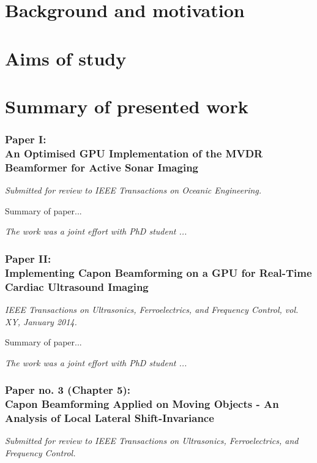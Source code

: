 \section{Background and motivation}

\section{Aims of study}

\section{Summary of presented work}

\subsubsection{Paper I:\\
An Optimised GPU Implementation of the MVDR Beamformer for Active Sonar Imaging}

{\it Submitted for review to IEEE Transactions on Oceanic Engineering.}
\vspace{0.3 cm}

Summary of paper...

\vspace{0.3 cm}
\emph{The work was a joint effort with PhD student ...}


\subsubsection{Paper II:\\
Implementing Capon Beamforming on a GPU for Real-Time Cardiac Ultrasound Imaging}

{\it IEEE Transactions on Ultrasonics, Ferroelectrics, and Frequency Control, vol. XY, January 2014.}
\vspace{0.3 cm}

Summary of paper...
 
\vspace{0.3 cm}
\emph{The work was a joint effort with PhD student ...}

\subsubsection{Paper no. 3 (Chapter 5):\\
Capon Beamforming Applied on Moving Objects - An Analysis of Local Lateral Shift-Invariance}

{\it Submitted for review to IEEE Transactions on Ultrasonics, Ferroelectrics, and Frequency Control.}
\vspace{0.3 cm}


